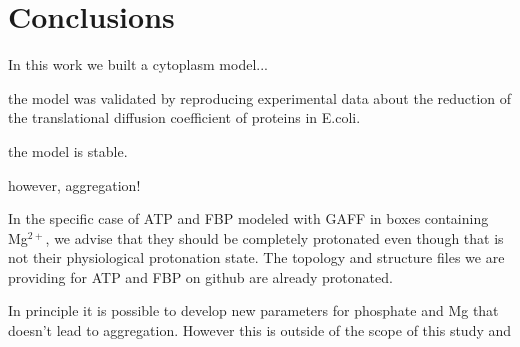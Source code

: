\documentclass[journal=jacsat,manuscript=article]{achemso}
\begin{document}
 
 

\section*{Conclusions}\label{sec:concl}

In this work we built a cytoplasm model...


the model was validated by reproducing experimental data about the reduction of the translational diffusion coefficient of proteins in E.coli.

the model is stable.

however, aggregation!

In the specific case of ATP and FBP modeled with GAFF in boxes containing Mg$^{2+}$, we advise that they should be completely protonated even though that is not their physiological protonation state. The topology and structure files we are providing for ATP and FBP on github are already protonated.

In principle it is possible to develop new parameters for phosphate and Mg that doesn't lead to aggregation. However this is outside of the scope of this study and 
 


 
\end{document}
